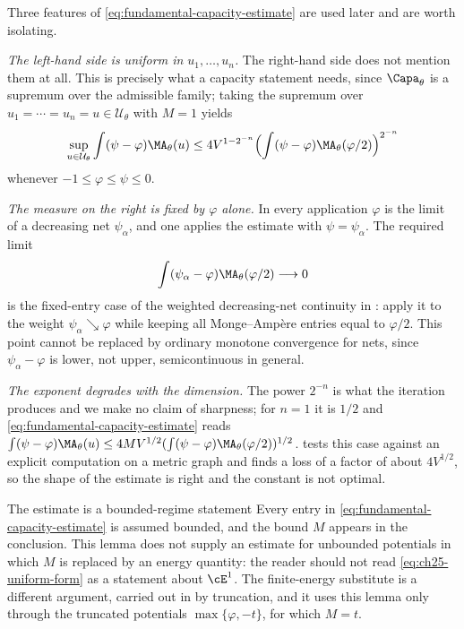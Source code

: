 \begin{remark}
\label{rem:ch25-reading-fundamental}
Three features of \eqref{eq:fundamental-capacity-estimate} are used later and
are worth isolating.

\emph{The left-hand side is uniform in $u_1,\ldots,u_n$.}  The right-hand
side does not mention them at all.  This is precisely what a capacity
statement needs, since $\Capa_\theta$ is a supremum over the admissible
family; taking the supremum over $u_1=\cdots=u_n=u\in\mathcal U_\theta$
with $M=1$ yields
\begin{equation}
\label{eq:ch25-uniform-form}
 \sup_{u\in\mathcal U_\theta}\int(\psi-\varphi)\MA_\theta(u)
 \leq4V^{1-2^{-n}}
 \Bigl(\int(\psi-\varphi)\MA_\theta(\varphi/2)\Bigr)^{2^{-n}}
\end{equation}
whenever $-1\leq\varphi\leq\psi\leq0$.

\emph{The measure on the right is fixed by $\varphi$ alone.}  In every
application $\varphi$ is the limit of a decreasing net $\psi_\alpha$, and
one applies the estimate with $\psi=\psi_\alpha$.  The required limit
\[
 \int(\psi_\alpha-\varphi)\MA_\theta(\varphi/2)\longrightarrow0
\]
is the fixed-entry case of the weighted decreasing-net continuity in
: apply it to the weight
$\psi_\alpha\searrow\varphi$ while keeping all Monge--Amp\`ere entries equal
to $\varphi/2$.  This point cannot be replaced by ordinary monotone
convergence for nets, since $\psi_\alpha-\varphi$ is lower, not upper,
semicontinuous in general.

\emph{The exponent degrades with the dimension.}  The power $2^{-n}$ is
what the iteration produces and we make no claim of sharpness; for
$n=1$ it is $1/2$ and \eqref{eq:fundamental-capacity-estimate} reads
$\int(\psi-\varphi)\MA_\theta(u)\leq4MV^{1/2}
(\int(\psi-\varphi)\MA_\theta(\varphi/2))^{1/2}$.
 tests this case against an explicit
computation on a metric graph and finds a loss of a factor of about
$4V^{1/2}$, so the shape of the estimate is right and the constant is not
optimal.
\end{remark}

\begin{warning}{The estimate is a bounded-regime statement}
Every entry in \eqref{eq:fundamental-capacity-estimate} is assumed bounded,
and the bound $M$ appears in the conclusion.  This lemma does not supply
an estimate for unbounded potentials in which $M$ is replaced by an energy
quantity: the reader should not read \eqref{eq:ch25-uniform-form} as a
statement about $\cE^1$.  The finite-energy substitute is a different
argument, carried out in
 by truncation, and it
uses this lemma only through the truncated potentials
$\max\{\varphi,-t\}$, for which $M=t$.
\end{warning}

